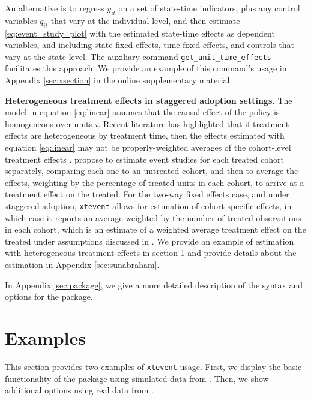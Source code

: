 \documentclass[12pt]{article}
\begin{document}
An alternative \citep{amemiya1978note, hansen2007generalized} is to regress $y_{it}$ on a set of state-time indicators, plus any control variables $q_{it}$ that vary at the individual level, and then estimate \eqref{eq:event_study_plot} with the estimated state-time effects as dependent variables, and including state fixed effects, time fixed effects, and controls that vary at the state level.
The auxiliary command \texttt{get\_unit\_time\_effects} facilitates this approach.
We provide an example of this command's usage in Appendix \ref{sec:xsection} in the online supplementary material.

\textbf{Heterogeneous treatment effects in staggered adoption settings.} The model in equation \eqref{eq:linear} assumes that the causal effect of the policy is homogeneous over units $i$.
Recent literature has highlighted that if treatment effects are heterogeneous by treatment time, then the effects estimated with equation \eqref{eq:linear} may not be properly-weighted averages of the cohort-level treatment effects \citep{athey2022design,callaway2021difference,goodman2021difference,sun2021estimating}.
\cite{sun2021estimating} propose to estimate event studies for each treated cohort separately, comparing each one to an untreated cohort, and then to average the effects, weighting by the percentage of treated units in each cohort, to arrive at a treatment effect on the treated.
For the two-way fixed effects case, and under staggered adoption, \texttt{xtevent} allows for estimation of cohort-specific effects, in which case it reports an average weighted by the number of treated observations in each cohort, which is an estimate of a weighted average treatment effect on the treated under assumptions discussed in \cite{sun2021estimating}.
We provide an example of estimation with heterogeneous treatment effects in section \ref{sec:examples} and provide details about the estimation in Appendix \ref{sec:sunabraham}.

In Appendix \ref{sec:package}, we give a more detailed description of the syntax and options for the \xtevent package.


\section{Examples}
\label{sec:examples}

This section provides two examples of \texttt{xtevent} usage.
First, we display the basic functionality of the package using simulated data from \citet{freyaldenhoven2021visualizationforth}.
Then, we show additional options using real data from \citet{martinez2022mobility}.
\end{document}
